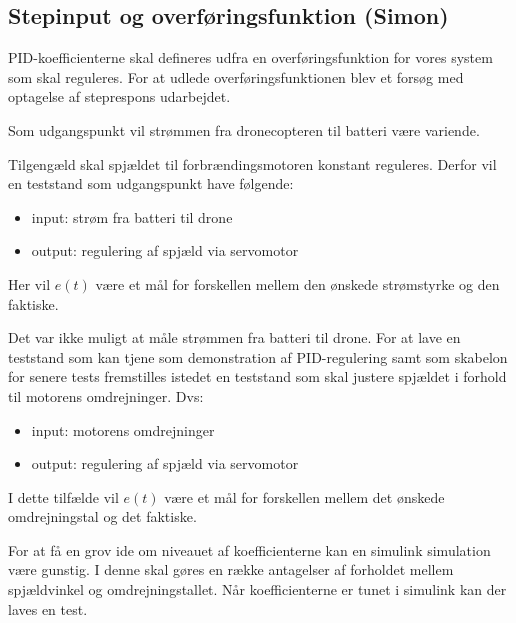 \subsection{Stepinput og overføringsfunktion (Simon)}
\label{sec:tests}

PID-koefficienterne skal defineres udfra en overføringsfunktion for vores system som skal reguleres. For at udlede overføringsfunktionen blev et forsøg med optagelse af steprespons udarbejdet.


Som udgangspunkt vil strømmen fra dronecopteren til batteri være variende.%

Tilgengæld skal spjældet til forbrændingsmotoren konstant reguleres. Derfor vil en teststand som udgangspunkt have følgende:
\begin{itemize}
\item input: strøm fra batteri til drone
\item output: regulering af spjæld via servomotor
\end{itemize}

Her vil $e(t)$ være et mål for forskellen mellem den ønskede strømstyrke og den faktiske.

Det var ikke muligt at måle strømmen fra batteri til drone. For at lave en teststand som kan tjene som demonstration af PID-regulering samt som skabelon for senere tests fremstilles istedet en teststand som skal justere spjældet i forhold til motorens omdrejninger. Dvs:

\begin{itemize}
\item input: motorens omdrejninger
\item output: regulering af spjæld via servomotor
\end{itemize}

I dette tilfælde vil $e(t)$ være et mål for forskellen mellem det ønskede omdrejningstal og det faktiske.

For at få en grov ide om niveauet af koefficienterne kan en simulink simulation være gunstig. I denne skal gøres en række antagelser af forholdet mellem spjældvinkel og omdrejningstallet. Når koefficienterne er tunet i simulink kan der laves en test.

